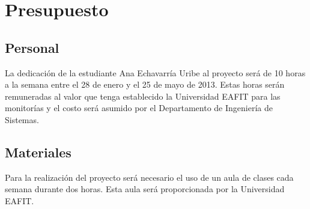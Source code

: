 \documentclass[11pt, oneside]{article}
\theoremstyle{definition}
\theoremstyle{remark}
\begin{document}
\section{Presupuesto}
	\subsection{Personal}
	La dedicación de la estudiante Ana Echavarría Uribe al proyecto será de 10 horas a la semana entre el 28 de enero y el 25 de mayo de 2013. Estas horas serán remuneradas al valor que tenga establecido la Universidad EAFIT para las monitorías y el costo será asumido por el Departamento de Ingeniería de Sistemas.
	\subsection{Materiales}
	Para la realización del proyecto será necesario el uso de un aula de clases cada semana durante dos horas. Esta aula será proporcionada por la Universidad EAFIT.
\end{document}
